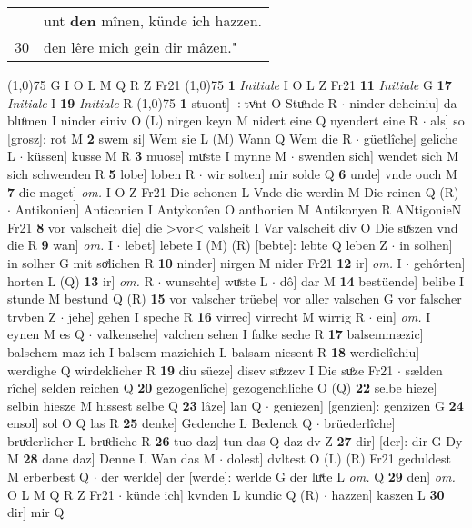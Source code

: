 \documentclass[8pt,a4paper,notitlepage]{article}
\begin{document}
\begin{table}[ht]
\begin{minipage}[t]{0.5\linewidth}
\begin{tabular}{rl}
 & unt \textbf{den} mînen, künde ich hazzen.\\ 
30 & den lêre mich gein dir mâzen."\\ 
\end{tabular}
\scriptsize
\line(1,0){75} \newline
G I O L M Q R Z Fr21 \newline
\line(1,0){75} \newline
\textbf{1} \textit{Initiale} I O L Z Fr21  \textbf{11} \textit{Initiale} G  \textbf{17} \textit{Initiale} I  \textbf{19} \textit{Initiale} R  \newline
\line(1,0){75} \newline
\textbf{1} stuont] ÷tvͦnt O Stuͦnde R  $\cdot$ ninder deheiniu] da bluͦmen I ninder einiv O (L) nirgen keyn M nidert eine Q nyendert eine R  $\cdot$ als] so [grosz]: rot M \textbf{2} swem si] Wem sie L (M) Wann Q Wem die R  $\cdot$ güetlîche] geliche L  $\cdot$ küssen] kusse M R \textbf{3} muose] muͤste I mynne M  $\cdot$ swenden sich] wendet sich M sich schwenden R \textbf{5} lobe] loben R  $\cdot$ wir solten] mir solde Q \textbf{6} unde] vnde ouch M \textbf{7} die maget] \textit{om.} I O Z Fr21 Die schonen L Vnde die werdin M Die reinen Q (R)  $\cdot$ Antikonien] Anticonien I Antykonîen O anthonien M Antikonyen R ANtigonieN Fr21 \textbf{8} vor valscheit die] die >vor< valsheit I Var valscheit div O Die suͯszen vnd die R \textbf{9} wan] \textit{om.} I  $\cdot$ lebet] lebete I (M) (R) [bebte]: lebte  Q leben Z  $\cdot$ in solhen] in solher G mit soͯlichen R \textbf{10} ninder] nirgen M nider Fr21 \textbf{12} ir] \textit{om.} I  $\cdot$ gehôrten] horten L (Q) \textbf{13} ir] \textit{om.} R  $\cdot$ wunschte] wuͯste L  $\cdot$ dô] dar M \textbf{14} bestüende] belibe I stunde M bestund Q (R) \textbf{15} vor valscher trüebe] vor aller valschen G vor falscher trvben Z  $\cdot$ jehe] gehen I speche R \textbf{16} virrec] virrecht M wirrig R  $\cdot$ ein] \textit{om.} I eynen M es Q  $\cdot$ valkensehe] valchen sehen I falke seche R \textbf{17} balsemmæzic] balschem maz ich I balsem mazichich L balsam niesent R \textbf{18} werdiclîchiu] werdighe Q wirdeklicher R \textbf{19} diu süeze] disev suͤzzev I Die suͦze Fr21  $\cdot$ sælden rîche] selden reichen Q \textbf{20} gezogenlîche] gezogenchliche O (Q) \textbf{22} selbe hieze] selbin hiesze M hissest selbe Q \textbf{23} lâze] lan Q  $\cdot$ geniezen] [genzien]: genzizen G \textbf{24} ensol] sol O Q las R \textbf{25} denke] Gedenche L Bedenck Q  $\cdot$ brüederlîche] bruͯderlicher L bruͦdiche R \textbf{26} tuo daz] tun das Q daz dv Z \textbf{27} dir] [der]: dir G Dy M \textbf{28} dane daz] Denne L Wan das M  $\cdot$ dolest] dvltest O (L) (R) Fr21 geduldest M erberbest Q  $\cdot$ der werlde] der [werde]: werlde G der luͯte L \textit{om.} Q \textbf{29} den] \textit{om.} O L M Q R Z Fr21  $\cdot$ künde ich] kvnden L kundic Q (R)  $\cdot$ hazzen] kaszen L \textbf{30} dir] mir Q \newline

\end{minipage}
\end{table}
\end{document}
